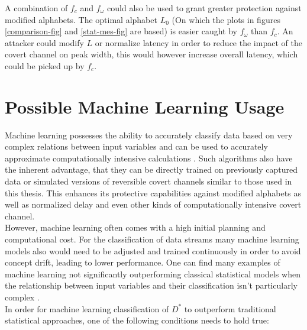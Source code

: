 \documentclass[12pt,a4paper,automark, toc=bib]{scrreprt}
\theoremstyle{definition}
\begin{document}
			A combination of $f_c$ and $f_\omega$ could also be used to grant greater protection against modified alphabets. The optimal alphabet $L_0$ (On which the plots in figures \ref{comparison-fig} and \ref{stat-mes-fig} are based) is easier caught by $f_\omega$ than $f_c$. An attacker could modify $L$ or normalize latency in order to reduce the impact of the covert channel on peak width, this would however increase overall latency, which could be picked up by $f_c$.
		\section{Possible Machine Learning Usage}
		\label{ens-stat}
			
			
			Machine learning possesses the ability to accurately classify data based on very complex relations between input variables and can be used to accurately approximate computationally intensive calculations \cite{ml_web1}. Such algorithms also have the inherent advantage, that they can be directly trained on previously captured data or simulated versions of reversible covert channels similar to those used in this thesis. This enhances its protective capabilities against modified alphabets as well as normalized delay and even other kinds of computationally intensive covert channel.\\
			However, machine learning often comes with a high initial planning and computational cost. For the classification of data streams many machine learning models also would need to be adjusted and trained continuously in order to avoid concept drift, leading to lower performance. One can find many examples of machine learning not significantly outperforming classical statistical models when the relationship between input variables and their classification isn't particularly complex \cite{Christodoulou2019}. 
			\pagebreak\\
			In order for machine learning classification of $D^*$ to outperform traditional statistical approaches, one of the following conditions needs to hold true:
			
\end{document}
